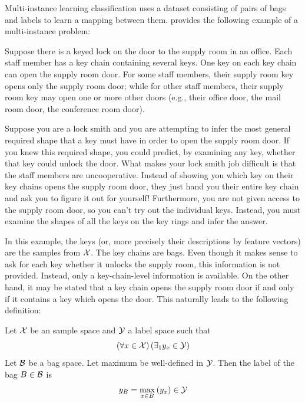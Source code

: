 Multi-instance learning classification uses a dataset consisting of pairs of bags and labels to learn a mapping between them. \cite{dietterich_solving_1997} provides the following example of a multi-instance problem:

\begin{example}
	Suppose there is a keyed lock on the door to the supply room in an office. Each staff member has a key chain containing several keys. One key on each key chain can open the supply room door. For some staff members, their supply room key opens only the supply room door; while for other staff members, their supply room key may open one or more other doors (e.g., their office door, the mail room door, the conference room door).

	Suppose you are a lock smith and you are attempting to infer the most general required shape that a key must have in order to open the supply room door. If you knew this required shape, you could predict, by examining any key, whether that key could unlock the door. What makes your lock smith job difficult is that the staff members are uncooperative. Instead of showing you which key on their key chains opens the supply room door, they just hand you their entire key chain and ask you to figure it out for yourself! Furthermore, you are not given access to the supply room door, so you can’t try out the individual keys. Instead, you must examine the shapes of all the keys on the key rings and infer the answer.
\end{example}

In this example, the keys (or, more precisely their descriptions by feature vectors) are the samples from \( \mathcal{X} \). The key chains are bags. Even though it makes sense to ask for each key whether it unlocks the supply room, this information is not provided. Instead, only a key-chain-level information is available. On the other hand, it may be stated that a key chain opens the supply room door if and only if it contains a key which opens the door. This naturally leads to the following definition:

\begin{define}\label{def:baglabel}
	Let \( \mathcal{X} \) be an sample space and \( \mathcal{Y} \) a label space such that
	\[ \left( \forall x \in \mathcal{X} \right) \left( \exists_1 y_x \in \mathcal{Y} \right) \]
	Let \( \mathcal{B} \) be a bag space. Let maximum be well-defined in \( \mathcal{Y} \). Then the label of the bag \( B \in \mathcal{B} \) is
	\[ y_B = \max_{x \in B} \left( y_x \right) \in \mathcal{Y} \]
\end{define}

